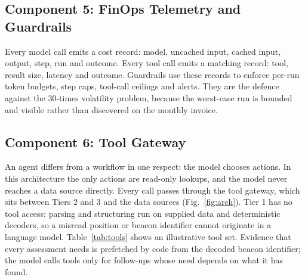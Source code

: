 \documentclass[conference]{IEEEtran}
\begin{document}
\subsection{Component 5: FinOps Telemetry and Guardrails}
\label{sec:finops}

Every model call emits a cost record: model, uncached input, cached input, output, step, run and outcome. Every tool call emits a matching record: tool, result size, latency and outcome. Guardrails use these records to enforce per-run token budgets, step caps, tool-call ceilings and alerts. They are the defence against the 30-times volatility problem, because the worst-case run is bounded and visible rather than discovered on the monthly invoice.


\subsection{Component 6: Tool Gateway}
\label{sec:tools}

An agent differs from a workflow in one respect: the model chooses actions. In this architecture the only actions are read-only lookups, and the model never reaches a data source directly. Every call passes through the tool gateway, which sits between Tiers 2 and 3 and the data sources (Fig.~\ref{fig:arch}). Tier 1 has no tool access: parsing and structuring run on supplied data and deterministic decoders, so a misread position or beacon identifier cannot originate in a language model. Table~\ref{tab:tools} shows an illustrative tool set. Evidence that every assessment needs is prefetched by code from the decoded beacon identifier; the model calls tools only for follow-ups whose need depends on what it has found.
\end{document}
